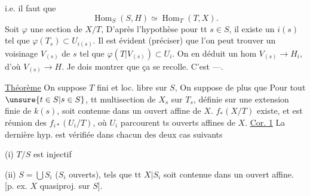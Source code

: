 i.e. il faut que
\[
\operatorname{Hom}_S(S,H)\simeq\operatorname{Hom}_T(T,X).
\]
Soit $\varphi$ une section de $X/T$,
D'après l'hypothèse  pour tt $s\in S$, il existe un $i(s)$ tel que $\varphi(T_s)\subset U_{i(s)}$. Il est évident (préciser) que l'on peut trouver un voisinage $V_{(s)}$ de $s$ tel que $\varphi(T\vert V_{(s)})\subset U_i$. On en déduit un hom $V_{(s)}\longrightarrow H_i$, d'où $V_{(s)}\longrightarrow H$.
Je dois montrer que ça se recolle. C'est  ---.

\uline{Théorème} On suppose $T$ fini et loc. libre sur $S$,
On suppose de plus que  
Pour tout $\unsure{t\in S|s\in S}$, tt multisection de $X_s$ sur $T_s$, définie sur une extension finie de $k(s)$, soit contenue dans un ouvert affine de $X$.
\deleted{[\unsure{condition Hyp.}}  
$f_*(X/T)$ existe, et est réunion des $f_{i*}(U_i/T)$, où $U_i$ parcourent ts ouverts affines de $X$.
\uline{Cor. 1} La dernière hyp.  est vérifiée dans chacun des deux cas suivants

(i) $T/S$ est  injectif

(ii) $S=\bigcup S_i$ ($S_i$ ouverts), tels que tt  $X\vert S_i$ soit contenue dans un ouvert affine.
[p. ex. $X$ quasiproj. sur $S$].

